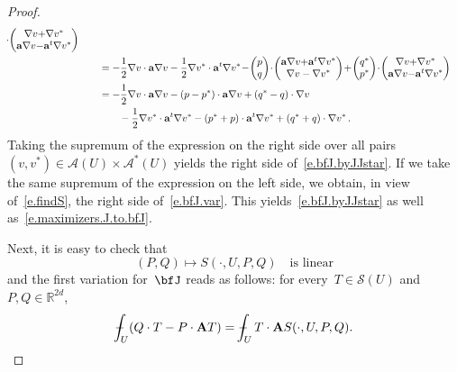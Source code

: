 \documentclass[11pt,twoside]{article} %
\numberwithin{equation}{section}
\theoremstyle{definition}
\newcommand*{\R}{\ensuremath{\mathbb{R}}}
\renewcommand{\a}{\mathbf{a}}
\renewcommand{\S}{\mathcal{S}}
\def\Xint#1{\mathchoice
{\XXint\displaystyle\textstyle{#1}}%
{\XXint\textstyle\scriptstyle{#1}}%
{\XXint\scriptstyle\scriptscriptstyle{#1}}%
{\XXint\scriptscriptstyle\scriptscriptstyle{#1}}%
\!\int}
\def\XXint#1#2#3{{\setbox0=\hbox{$#1{#2#3}{\int}$}
\vcenter{\hbox{$#2#3$}}\kern-.5\wd0}}
\def\fint{\Xint-}
\newcommand{\A}{\mathcal{A}}
\newcommand{\bfA}{\mathbf{A}}
\begin{document}
\begin{proof}
\begin{align}
\!\cdot\!
\begin{pmatrix} \nabla v{+}\nabla v^* \\ 
\a\nabla v {-} \a^t\nabla v^* \end{pmatrix}
\notag \\ & \qquad
=
- \frac12 \nabla v \cdot \a \nabla v - \frac12 \nabla v^* \cdot \a^t \nabla v^*
\! - \!
\begin{pmatrix} p \\ q \end{pmatrix} 
\!\cdot\!
\begin{pmatrix} \a\nabla v {+} \a^t\nabla v^* \\ \nabla v - \nabla v^*  \end{pmatrix}
\! + \!
\begin{pmatrix} q^* \\ p^* \end{pmatrix}
\!\cdot\!
\begin{pmatrix} \nabla v{+}\nabla v^* \\ 
\a\nabla v {-} \a^t\nabla v^* \end{pmatrix}
\notag \\ & \qquad
=
- \frac12 \nabla v \cdot \a\nabla v 
- (p-p^*)\cdot \a\nabla v
+(q^*-q)\cdot \nabla v
\notag \\ & \qquad \qquad
- \frac12 \nabla v^* \cdot \a^t \nabla v^*
-(p^*+p)\cdot\a^t\nabla v^* 
+(q^*+q)\cdot \nabla v^*
\,.
\end{align}
Taking the supremum of the expression on the right side over all pairs~$(v,v^*) \in \A(U) \times \A^*(U)$ yields the right side of~\eqref{e.bfJ.byJJstar}. If we take the same supremum of the expression on the left side, we obtain, in view of~\eqref{e.findS}, the right side of~\eqref{e.bfJ.var}. 
This yields~\eqref{e.bfJ.byJJstar} as well as~\eqref{e.maximizers.J.to.bfJ}.

\smallskip

Next, it is easy to check that 
\begin{equation}
\label{e.Slinear}
(P,Q) \mapsto S(\cdot,U,P,Q) \quad \mbox{is linear}
\end{equation}
and the first variation for~$\bfJ$ reads as follows:
for every~$T\in \S(U)$ and~$P,Q \in\R^{2d}$, 
\begin{equation}
\label{e.firstvar.nonsymm.dbl}
\fint_U (Q \cdot T - P \cdot \bfA T )
=
\fint_U T \cdot \bfA S(\cdot,U,P,Q ). 
\end{equation} 

\smallskip


\end{proof}
\end{document}
